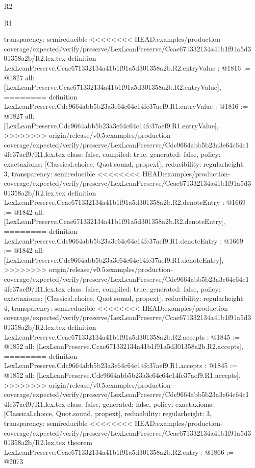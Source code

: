 \begin{lexlean}{R2}
\begin{lexlean}{R1}
\begin{coremodule}
{{{{{{{{{{{{{{{  transparency: semireducible
}
<<<<<<<< HEAD:examples/production-coverage/expected/verify/preserve/LexLeanPreserve/Ccae671332134a41b1f91a5d301358a2b/R2.lex.tex
definition LexLeanPreserve.Ccae671332134a41b1f91a5d301358a2b.R2.entryValue : @1816 := @1827 {
  all: [LexLeanPreserve.Ccae671332134a41b1f91a5d301358a2b.R2.entryValue],
========
definition LexLeanPreserve.Cdc9664abb5b23a3e64c64c14fc37aef9.R1.entryValue : @1816 := @1827 {
  all: [LexLeanPreserve.Cdc9664abb5b23a3e64c64c14fc37aef9.R1.entryValue],
>>>>>>>> origin/release/v0.5:examples/production-coverage/expected/verify/preserve/LexLeanPreserve/Cdc9664abb5b23a3e64c64c14fc37aef9/R1.lex.tex
  class: false,
  compiled: true,
  generated: false,
  policy: exact{axioms: [Classical.choice, Quot.sound, propext]},
  reducibility: regular{height: 3},
  transparency: semireducible
}
<<<<<<<< HEAD:examples/production-coverage/expected/verify/preserve/LexLeanPreserve/Ccae671332134a41b1f91a5d301358a2b/R2.lex.tex
definition LexLeanPreserve.Ccae671332134a41b1f91a5d301358a2b.R2.denoteEntry : @1669 := @1842 {
  all: [LexLeanPreserve.Ccae671332134a41b1f91a5d301358a2b.R2.denoteEntry],
========
definition LexLeanPreserve.Cdc9664abb5b23a3e64c64c14fc37aef9.R1.denoteEntry : @1669 := @1842 {
  all: [LexLeanPreserve.Cdc9664abb5b23a3e64c64c14fc37aef9.R1.denoteEntry],
>>>>>>>> origin/release/v0.5:examples/production-coverage/expected/verify/preserve/LexLeanPreserve/Cdc9664abb5b23a3e64c64c14fc37aef9/R1.lex.tex
  class: false,
  compiled: true,
  generated: false,
  policy: exact{axioms: [Classical.choice, Quot.sound, propext]},
  reducibility: regular{height: 4},
  transparency: semireducible
}
<<<<<<<< HEAD:examples/production-coverage/expected/verify/preserve/LexLeanPreserve/Ccae671332134a41b1f91a5d301358a2b/R2.lex.tex
definition LexLeanPreserve.Ccae671332134a41b1f91a5d301358a2b.R2.accepts : @1845 := @1852 {
  all: [LexLeanPreserve.Ccae671332134a41b1f91a5d301358a2b.R2.accepts],
========
definition LexLeanPreserve.Cdc9664abb5b23a3e64c64c14fc37aef9.R1.accepts : @1845 := @1852 {
  all: [LexLeanPreserve.Cdc9664abb5b23a3e64c64c14fc37aef9.R1.accepts],
>>>>>>>> origin/release/v0.5:examples/production-coverage/expected/verify/preserve/LexLeanPreserve/Cdc9664abb5b23a3e64c64c14fc37aef9/R1.lex.tex
  class: false,
  generated: false,
  policy: exact{axioms: [Classical.choice, Quot.sound, propext]},
  reducibility: regular{height: 3},
  transparency: semireducible
}
<<<<<<<< HEAD:examples/production-coverage/expected/verify/preserve/LexLeanPreserve/Ccae671332134a41b1f91a5d301358a2b/R2.lex.tex
theorem LexLeanPreserve.Ccae671332134a41b1f91a5d301358a2b.R2.entry : @1866 := @2073 {
}}}}}}}}}}}}}}}}}}
\end{coremodule}
\end{lexlean}
\end{lexlean}
